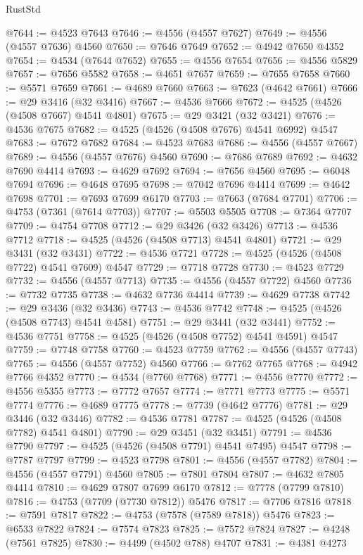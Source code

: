 \begin{lexlean}{RustStd}
\begin{coremodule}
@7644 := @4523 @7643
@7646 := @4556 (@4557 @7627)
@7649 := @4556 (@4557 @7636) @4560
@7650 := @7646 @7649
@7652 := @4942 @7650 @4352
@7654 := @4534 (@7644 @7652)
@7655 := @4556 @7654
@7656 := @4556 @5829
@7657 := @7656 @5582
@7658 := @4651 @7657
@7659 := @7655 @7658
@7660 := @5571 @7659
@7661 := @4689 @7660
@7663 := @7623 (@4642 @7661)
@7666 := @29 @3416 (@32 @3416)
@7667 := @4536 @7666
@7672 := @4525 (@4526 (@4508 @7667) @4541 @4801)
@7675 := @29 @3421 (@32 @3421)
@7676 := @4536 @7675
@7682 := @4525 (@4526 (@4508 @7676) @4541 @6992) @4547
@7683 := @7672 @7682
@7684 := @4523 @7683
@7686 := @4556 (@4557 @7667)
@7689 := @4556 (@4557 @7676) @4560
@7690 := @7686 @7689
@7692 := @4632 @7690 @4414
@7693 := @4629 @7692
@7694 := @7656 @4560
@7695 := @6048 @7694
@7696 := @4648 @7695
@7698 := @7042 @7696 @4414
@7699 := @4642 @7698
@7701 := @7693 @7699 @6170
@7703 := @7663 (@7684 @7701)
@7706 := @4753 (@7361 (@7614 @7703))
@7707 := @5503 @5505
@7708 := @7364 @7707
@7709 := @4754 @7708
@7712 := @29 @3426 (@32 @3426)
@7713 := @4536 @7712
@7718 := @4525 (@4526 (@4508 @7713) @4541 @4801)
@7721 := @29 @3431 (@32 @3431)
@7722 := @4536 @7721
@7728 := @4525 (@4526 (@4508 @7722) @4541 @7609) @4547
@7729 := @7718 @7728
@7730 := @4523 @7729
@7732 := @4556 (@4557 @7713)
@7735 := @4556 (@4557 @7722) @4560
@7736 := @7732 @7735
@7738 := @4632 @7736 @4414
@7739 := @4629 @7738
@7742 := @29 @3436 (@32 @3436)
@7743 := @4536 @7742
@7748 := @4525 (@4526 (@4508 @7743) @4541 @4581)
@7751 := @29 @3441 (@32 @3441)
@7752 := @4536 @7751
@7758 := @4525 (@4526 (@4508 @7752) @4541 @4591) @4547
@7759 := @7748 @7758
@7760 := @4523 @7759
@7762 := @4556 (@4557 @7743)
@7765 := @4556 (@4557 @7752) @4560
@7766 := @7762 @7765
@7768 := @4942 @7766 @4352
@7770 := @4534 (@7760 @7768)
@7771 := @4556 @7770
@7772 := @4556 @5355
@7773 := @7772 @7657
@7774 := @7771 @7773
@7775 := @5571 @7774
@7776 := @4689 @7775
@7778 := @7739 (@4642 @7776)
@7781 := @29 @3446 (@32 @3446)
@7782 := @4536 @7781
@7787 := @4525 (@4526 (@4508 @7782) @4541 @4801)
@7790 := @29 @3451 (@32 @3451)
@7791 := @4536 @7790
@7797 := @4525 (@4526 (@4508 @7791) @4541 @7495) @4547
@7798 := @7787 @7797
@7799 := @4523 @7798
@7801 := @4556 (@4557 @7782)
@7804 := @4556 (@4557 @7791) @4560
@7805 := @7801 @7804
@7807 := @4632 @7805 @4414
@7810 := @4629 @7807 @7699 @6170
@7812 := @7778 (@7799 @7810)
@7816 := @4753 (@7709 (@7730 @7812)) @5476
@7817 := @7706 @7816
@7818 := @7591 @7817
@7822 := @4753 (@7578 (@7589 @7818)) @5476
@7823 := @6533 @7822
@7824 := @7574 @7823
@7825 := @7572 @7824
@7827 := @4248 (@7561 @7825)
@7830 := @4499 (@4502 @788) @4707
@7831 := @4381 @4273

\end{coremodule}
\end{lexlean}
